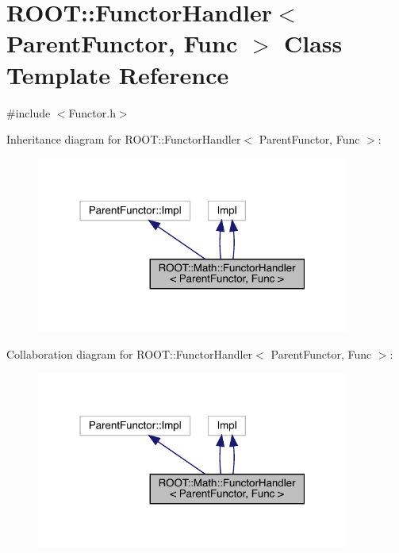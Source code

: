 \hypertarget{classROOT_1_1Math_1_1FunctorHandler}{}\section{R\+O\+OT\+:\+:Functor\+Handler$<$ Parent\+Functor, Func $>$ Class Template Reference}
\label{classROOT_1_1Math_1_1FunctorHandler}


{\ttfamily \#include $<$Functor.\+h$>$}



Inheritance diagram for R\+O\+OT\+:\+:Functor\+Handler$<$ Parent\+Functor, Func $>$\+:
\nopagebreak
\begin{figure}[H]
\begin{center}
\leavevmode
\includegraphics[width=292pt]{d9/dc5/classROOT_1_1Math_1_1FunctorHandler__inherit__graph}
\end{center}
\end{figure}


Collaboration diagram for R\+O\+OT\+:\+:Functor\+Handler$<$ Parent\+Functor, Func $>$\+:
\nopagebreak
\begin{figure}[H]
\begin{center}
\leavevmode
\includegraphics[width=292pt]{d5/da4/classROOT_1_1Math_1_1FunctorHandler__coll__graph}
\end{center}
\end{figure}
